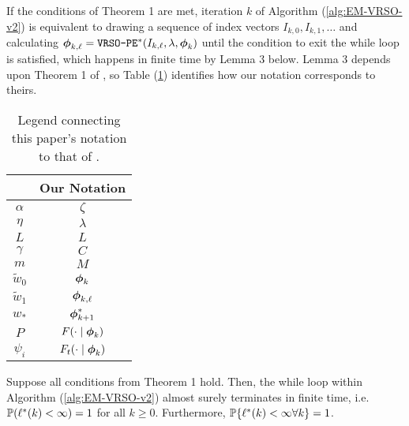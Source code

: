 If the conditions of Theorem 1 are met, iteration $k$ of Algorithm (\ref{alg:EM-VRSO-v2}) is equivalent to drawing a sequence of index vectors $I_{k,0},I_{k,1},\ldots$ and calculating $\boldsymbol{\phi}_{k,\ell} = \texttt{VRSO-PE}^*(I_{k,\ell},\lambda,\boldsymbol{\phi}_{k})$ until the condition to exit the while loop is satisfied, which happens in finite time by Lemma 3 below. Lemma 3 depends upon Theorem 1 of \citet{Johnson:2013}, so Table (\ref{tbl:notation}) identifies how our notation corresponds to theirs.
%
\begin{table}[]
\centering
\begin{tabular}{c|c}
\citet{Johnson:2013}                  & Our Notation                          \\ \hline
$\alpha$                              & $\zeta$                               \\
$\eta$                                & $\lambda$                             \\
$L$                                   & $L$                                   \\
$\gamma$                              & $C$                                   \\
$m$                                   & $M$                                   \\
$\tilde{w}_0$                         & $\boldsymbol{\phi}_{k}$                          \\
$\tilde{w}_1$                         & $\boldsymbol{\phi}_{k,\ell}$                     \\
$w_{*}$                               & $\boldsymbol{\phi}^*_{k+1}$                      \\
$P$                                   & $F(\cdot \mid \boldsymbol{\phi}_k)$              \\
$\psi_i$                              & $F_t(\cdot \mid \boldsymbol{\phi}_k)$                         
\end{tabular}
\caption{Legend connecting this paper's notation to that of \citet{Johnson:2013}.}
\label{tbl:notation}
\end{table}

\begin{lemma}
    Suppose all conditions from Theorem 1 hold. Then, the while loop within Algorithm (\ref{alg:EM-VRSO-v2}) almost surely terminates in finite time, i.e. $\mathbb{P}(\ell^*(k) < \infty) = 1$ for all $k \geq 0$. Furthermore, $\mathbb{P}\{\ell^*(k) < \infty \forall k\} = 1$.
\end{lemma}

